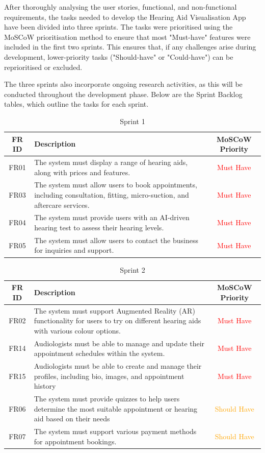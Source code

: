 \documentclass{article}
\begin{document}
After thoroughly analysing the user stories, functional, and non-functional requirements, the tasks needed to develop the Hearing Aid Visualisation App have been divided into three sprints. The tasks were prioritised using the MoSCoW prioritisation method to ensure that most "Must-have" features were included in the first two sprints. This ensures that, if any challenges arise during development, lower-priority tasks ("Should-have" or "Could-have") can be reprioritised or excluded.

The three sprints also incorporate ongoing research activities, as this will be conducted throughout the development phase. Below are the Sprint Backlog tables, which outline the tasks for each sprint.


\begin{table}[H]
\centering
\label{tab:functional-requirements}
\begin{tabular}{|c|p{8cm}|c|}
\hline
\textbf{FR ID} & \textbf{Description} & \textbf{MoSCoW Priority} \\ \hline
FR01 & The system must display a range of hearing aids, along with prices and features. & \textcolor{red}{Must Have} \\ \hline
FR03 & The system must allow users to book appointments, including consultation, fitting, micro-suction, and aftercare services. & \textcolor{red}{Must Have} \\ \hline
FR04 & The system must provide users with an AI-driven hearing test to assess their hearing levels. & \textcolor{red}{Must Have} \\ \hline
FR05 & The system must allow users to contact the business for inquiries and support. & \textcolor{red}{Must Have} \\ \hline
\end{tabular}
\caption{Sprint 1}
\end{table}

\begin{table}[H]
\centering
\label{tab:functional-requirements}
\begin{tabular}{|c|p{8cm}|c|}
\hline
\textbf{FR ID} & \textbf{Description} & \textbf{MoSCoW Priority} \\ \hline
FR02 & The system must support Augmented Reality (AR) functionality for users to try on different hearing aids with various colour options. & \textcolor{red}{Must Have} \\ \hline
FR14 & Audiologists must be able to manage and update their appointment schedules within the system. & \textcolor{red}{Must Have} \\ \hline
FR15 & Audiologists must be able to create and manage their profiles, including bio, images, and appointment history & \textcolor{red}{Must Have} \\ \hline
FR06 & The system must provide quizzes to help users determine the most suitable appointment or hearing aid based on their needs & \textcolor{orange}{Should Have} \\ \hline
FR07 & The system must support various payment methods for appointment bookings. & \textcolor{orange}{Should Have} \\ \hline
\end{tabular}
\caption{Sprint 2}
\end{table}
\end{document}
